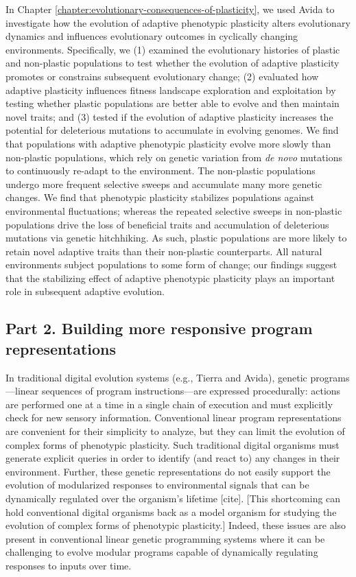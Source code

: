 In Chapter \ref{chapter:evolutionary-consequences-of-plasticity}, we used Avida to investigate how the evolution of adaptive phenotypic plasticity alters evolutionary dynamics and influences evolutionary outcomes in cyclically changing environments.
Specifically, we 
(1) examined the evolutionary histories of plastic and non-plastic populations to test whether the evolution of adaptive plasticity promotes or constrains subsequent evolutionary change;
(2) evaluated how adaptive plasticity influences fitness landscape exploration and exploitation by testing whether plastic populations are better able to evolve and then maintain novel traits;
and (3) tested if the evolution of adaptive plasticity increases the potential for deleterious mutations to accumulate in evolving genomes.
We find that populations with adaptive phenotypic plasticity evolve more slowly than non-plastic populations, which rely on genetic variation from \textit{de novo} mutations to continuously re-adapt to the environment.
The non-plastic populations undergo more frequent selective sweeps and accumulate many more genetic changes. %
We find that phenotypic plasticity stabilizes populations against environmental fluctuations; whereas the repeated selective sweeps in non-plastic populations drive the loss of beneficial traits and accumulation of deleterious mutations via genetic hitchhiking.  
As such, plastic populations are more likely to retain novel adaptive traits than their non-plastic counterparts. 
All natural environments subject populations to some form of change; our findings suggest that the stabilizing effect of adaptive phenotypic plasticity plays an important role in subsequent adaptive evolution.

\subsection{Part 2. Building more responsive program representations}

In traditional digital evolution systems (e.g., Tierra and Avida), genetic programs---linear sequences of program instructions---are expressed procedurally: actions are performed one at a time in a single chain of execution and must explicitly check for new sensory information.
Conventional linear program representations are convenient for their simplicity to analyze, but they can limit the evolution of complex forms of phenotypic plasticity. 
Such traditional digital organisms must generate explicit queries in order to identify (and react to) any changes in their environment.
Further, these genetic representations do not easily support the evolution of modularized responses to environmental signals that can be dynamically regulated over the organism's lifetime [cite].
[This shortcoming can hold conventional digital organisms back as a model organism for studying the evolution of complex forms of phenotypic plasticity.]
Indeed, these issues are also present in conventional linear genetic programming systems where it can be challenging to evolve modular programs capable of dynamically regulating responses to inputs over time. 

